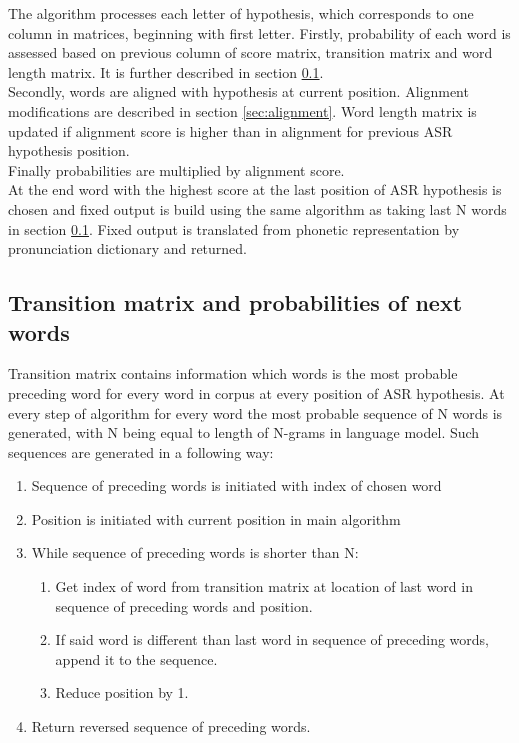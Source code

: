 \documentclass[a4paper,11pt,twoside]{report}
\theoremstyle{definition}
\begin{document}
The algorithm processes each letter of hypothesis, which corresponds to one column in matrices, beginning with first letter. Firstly, probability of each word is assessed based on previous column of score matrix, transition matrix and word length matrix. It is further described in section \ref{sec:transition}.\\
Secondly, words are aligned with hypothesis at current position. Alignment modifications are described in section \ref{sec:alignment}. Word length matrix is updated if alignment score is higher than in alignment for previous ASR hypothesis position. \\
Finally probabilities are multiplied by alignment score.\\

At the end word with the highest score at the last position of ASR hypothesis is chosen and fixed output is build using the same algorithm as taking last N words in section \ref{sec:transition}. Fixed output is translated from phonetic representation by pronunciation dictionary and returned.


\subsection{Transition matrix and probabilities of next words} \label{sec:transition}

Transition matrix contains information which words is the most probable preceding word for every word in corpus at every position of ASR hypothesis. At every step of algorithm for every word the most probable sequence of N words is generated, with N being equal to length of N-grams in language model. Such sequences are generated in a following way:\\
\begin{enumerate}
    \item Sequence of preceding words is initiated with index of chosen word
    \item Position is initiated with current position in main algorithm
    \item While sequence of preceding words is shorter than N:
    \begin{enumerate}
        \item Get index of word from transition matrix at location of last word in sequence of preceding words and position.
        \item If said word is different than last word in sequence of preceding words, append it to the sequence.
        \item Reduce position by 1.
    \end{enumerate}
    \item Return reversed sequence of preceding words.
\end{enumerate}
\end{document}

